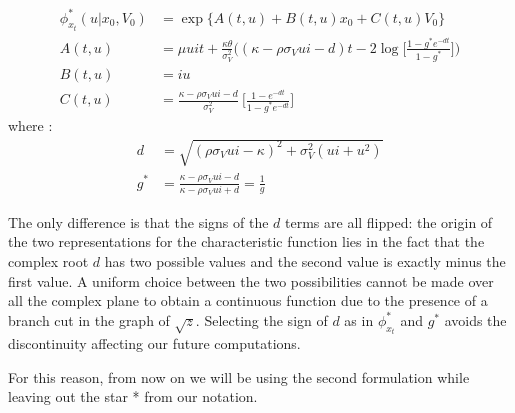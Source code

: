 
\begin{equation}
\begin{split}
\phi_{x_t}^*(u| x_0, V_0) &= \exp\{A(t,u) + B(t,u) x_0 + C(t,u) V_0\}\\
A(t,u) &= \mu u i t +  \frac{\kappa\theta}{\sigma_V^2} \bigg( (\kappa - \rho\sigma_V u i - d)t - 2 \log\Big[  \frac{1-g^*e^{-dt}}{1-g^*} \Big] \bigg)\\
B(t,u) &= i u \\
C(t,u)&= \frac{\kappa - \rho\sigma_V u i - d}{\sigma_V^2} \:\Big[\frac{1-e^{-dt}}{1-g^*e^{-dt}}\Big]
\end{split}
\end{equation} 
where :
\begin{equation*}
\begin{split}
d&=\sqrt{(\rho \sigma_V u i - \kappa)^2 + \sigma_V^2(u i + u^2)}\\
g^*&= \frac{\kappa - \rho\sigma_V u i - d}{\kappa - \rho\sigma_V u i + d} = \frac{1}{g}
\end{split}
\end{equation*} 

The only difference is that the signs of the $d$ terms are all flipped: the origin of the two representations for the characteristic function lies in the fact that the complex root $d$ has two possible values and the second value is exactly minus the first value.
A uniform choice between the two possibilities cannot be made over all the complex plane to obtain a continuous function due to the presence of a branch cut in the graph of $\sqrt{z}$. Selecting the sign of $d$ as in $\phi_{x_t}^*$ and $g^*$ avoids the discontinuity affecting our future computations.

For this reason, from now on we will be using the second formulation while leaving out the star * from our notation.

